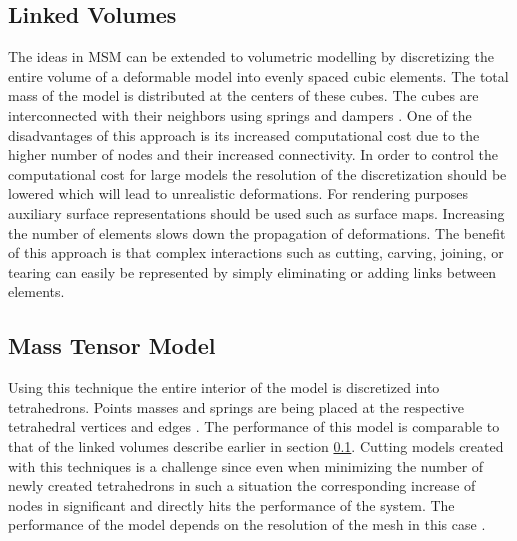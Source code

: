 \subsection{Linked Volumes}
\label{sec:linkedvolumes}
The ideas in MSM can be extended to volumetric modelling by discretizing the entire volume of a deformable model into evenly spaced cubic elements.
The total mass of the model is distributed at the centers of these cubes. The cubes are interconnected with their neighbors using springs and dampers
\cite{gibson1997simulating}. One of the disadvantages of this approach is its increased computational cost due to the higher number of nodes and
their increased connectivity. In order to control the computational cost for large models the resolution of the discretization should be lowered 
which will lead to unrealistic deformations. For rendering purposes auxiliary surface representations should be used such as surface maps. 
Increasing the number of elements slows down the propagation of deformations. The benefit of this approach is that complex interactions such as
cutting, carving, joining, or tearing can easily be represented by simply eliminating or adding links between elements.


\subsection{Mass Tensor Model}
Using this technique the entire interior of the model is discretized into tetrahedrons. Points masses and springs are 
being placed at the respective tetrahedral vertices and edges \cite{de1999modeling}. The performance of this model is comparable to that of the 
linked volumes describe earlier in section \ref{sec:linkedvolumes}. Cutting models created with this techniques is a challenge since even when
minimizing the number of newly created tetrahedrons in such a situation the corresponding increase of nodes in significant and directly hits the
performance of the system. The performance of the model depends on the resolution of the mesh in this case \cite{picinbono2000real}. 


